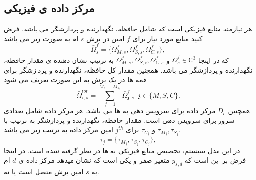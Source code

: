 \subsection{مرکز داده ی فیزیکی}
هر 
نیازمند منابع فیزیکی است که شامل حافظه، نگهدارنده و پردازشگر می باشد.
فرض کنید منابع مورد نیاز برای $f$ امین  در برش $s$ ام به صورت زیر می باشد
 \begin{equation}
\bar{\Omega}_{s}^f = \{\Omega_{M,{s}}^f, \Omega_{S,{s}}^f, \Omega_{C,{s}}^f \},
\end{equation}
که در اینجا 
 $\bar{\Omega}_{s}^f\in \mathbb{C}^{3}$
 و
$\Omega_{M,{s}}^f, \Omega_{S,{s}}^f, \Omega_{C,{s}}^f$
به ترتیب نشان دهنده ی مقدار حافظه، نگهدارنده و پردازشگر می باشد.
همچنین مقدار کل حافظه، نگهدارنده و پردازشگر برای همه  ها در یک برش به این صورت تعریف می شود
\begin{equation}
\textstyle \bar{\Omega}_{\mathfrak{z},s}^{tot} = \sum_{f=1}^{M_{s_1} + M_{s_2}}\bar{\Omega}_{\mathfrak{z},s}^f \;\; \mathfrak{z} \in \{M, S, C\}.
\end{equation}
همچنین $D_c$ مرکز داده برای سرویس دهی به  ها می باشد. هر مرکز داده شامل تعدادی سرور برای سرویس دهی است.
مقدار حافظه، نگهدارنده و پردازشگر به ترتیب با 
$\tau_{M_{j}}, \tau_{S_{j}}$
و
$\tau_{C_{j}} $
برای 
$j^{th}$
امین مرکز داده به ترتیب زیر می باشد.
\begin{equation*}
\tau_j = \{\tau_{M_{j}}, \tau_{S_{j}}, \tau_{C_{j}} \},
\end{equation*}
در این مدل سیستم، 
تخصیص منابع فیزیکی به  ها در نظر گرفته شده است. 
در اینجا فرض بر این است که $y_{s,d}$ متغیر صفر و یکی است که نشان میدهد مرکز داده ی $d$ ام به $s$ امین برش متصل است یا نه.
